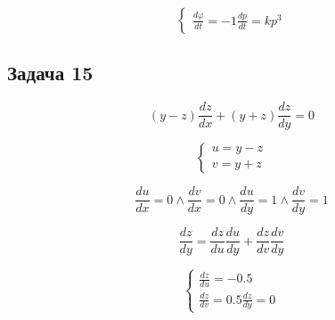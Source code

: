 \documentclass[a4paper,12pt]{article}
\begin{document}
\[
\begin{cases}
    \frac{d\varphi}{dt} = -1
    \frac{dp}{dt} = kp^3
\end{cases}
\]

\subsection{Задача 15}

\[
(y-z)\frac{dz}{dx} + (y+z)\frac{dz}{dy} = 0 
\]

\[
\begin{cases}
    u = y-z \\
    v = y + z 
\end{cases}
\]

\[
\frac{du}{dx} = 0 \land \frac{dv}{dx} = 0 \land \frac{du}{dy} = 1 \land \frac{dv}{dy} = 1
\]

\[
\frac{dz}{dy} = \frac{dz}{du}\frac{du}{dy} + \frac{dz}{dv}\frac{dv}{dy}
\]

\[
\begin{cases}
    \frac{dz}{du} = -0.5 \\
    \frac{dz}{dv} = 0.5
    \frac{dz}{dy} = 0
\end{cases}
\]
\end{document}
